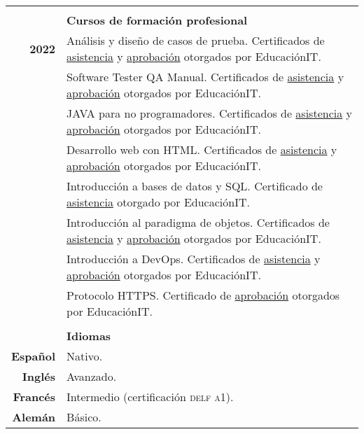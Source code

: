 \documentclass[12pt,a4paper]{article}
\begin{document}
\begin{longtable}[t]{r p{12cm}}
 \pagebreak
 & \\
 & \textbf{Cursos de formación profesional} \\
\cline{2-2}
\textbf{2022} & Análisis y diseño de casos de prueba. Certificados de \href{https://1drv.ms/b/s!AgXxKbaw9rfPiARWpusuUxhE0wli?e=fpeg86}{asistencia} y \href{https://1drv.ms/b/s!AgXxKbaw9rfPiAJQ5pvh-rHR5E9P?e=rqxedq}{aprobación} otorgados por EducaciónIT. \\
              & Software Tester QA Manual. Certificados de \href{https://1drv.ms/b/s!AgXxKbaw9rfPinl2OYyScnj9cT-2?e=3zIFgY}{asistencia} y \href{https://1drv.ms/b/s!AgXxKbaw9rfPh0PhetsnIUSpbF12?e=pu1IeQ}{aprobación} otorgados por EducaciónIT. \\
              & JAVA para no programadores. Certificados de \href{https://1drv.ms/b/s!AgXxKbaw9rfPiT17pM40SCem4Bz5?e=24jo5G}{asistencia} y \href{https://1drv.ms/b/s!AgXxKbaw9rfPil5vd1FMXUgKGw6Y?e=23fAvz}{aprobación} otorgados por EducaciónIT. \\
              & Desarrollo web con HTML. Certificados de \href{https://1drv.ms/b/s!AgXxKbaw9rfPiRQvFhaJl9l61Lcc?e=EQmXAr}{asistencia} y \href{https://1drv.ms/b/s!AgXxKbaw9rfPixilMsmDXOfCizDJ?e=bclJY0}{aprobación} otorgados por EducaciónIT. \\
              & Introducción a bases de datos y SQL. Certificado de \href{https://1drv.ms/b/s!AgXxKbaw9rfPikmF4wx1J_vxqFGi?e=LCSQZh}{asistencia} otorgado por EducaciónIT. \\
              & Introducción al paradigma de objetos. Certificados de \href{https://1drv.ms/b/s!AgXxKbaw9rfPiX-Dr1cu1LTxGIEa?e=qyfRm5}{asistencia} y \href{https://1drv.ms/b/s!AgXxKbaw9rfPixS5KpEkcy02sFvT?e=gy3wY9}{aprobación} otorgados por EducaciónIT. \\
              & Introducción a DevOps. Certificados de \href{https://1drv.ms/b/s!AgXxKbaw9rfPiwIOPv-l5QB5ywGL?e=wUloD9}{asistencia} y \href{https://1drv.ms/b/s!AgXxKbaw9rfPiyqJemrAly3msqm-?e=s3LDTx}{aprobación} otorgados por EducaciónIT. \\
              & Protocolo HTTPS. Certificado de \href{https://1drv.ms/b/s!AgXxKbaw9rfPiznTwZw5hsxe72iq?e=upVLIV}{aprobación} otorgados por EducaciónIT. \\

  & \\
  & \textbf{Idiomas} \\
 \cline{2-2}
 \textbf{Español} & Nativo. \\
 \textbf{Inglés}  & Avanzado. \\
 \textbf{Francés} & Intermedio (certificación \textsc{delf a1}). \\
 \textbf{Alemán}  & Básico. \\


\end{longtable}
\end{document}

